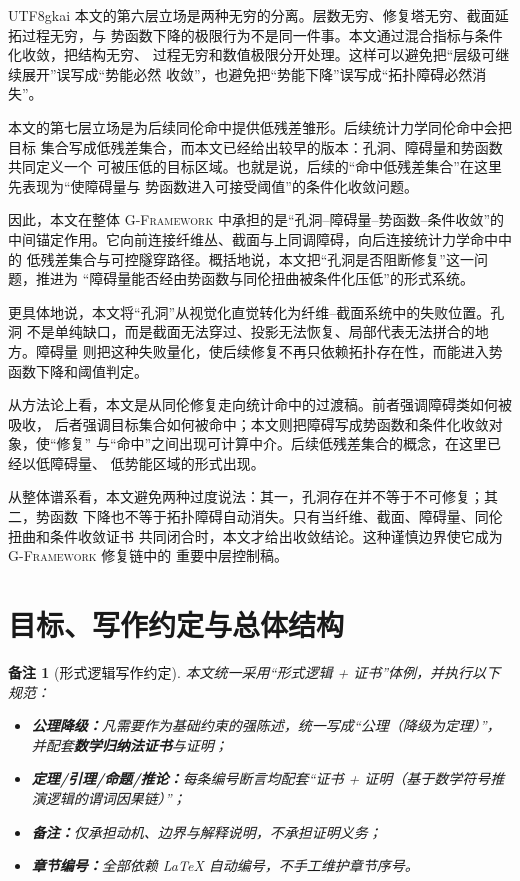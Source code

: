 \documentclass[12pt]{article}
\newtheorem{remark}{备注}[section]
\newcommand{\GFramework}{\textsc{G-Framework}}
\begin{document}
\begin{CJK*}{UTF8}{gkai}
本文的第六层立场是两种无穷的分离。层数无穷、修复塔无穷、截面延拓过程无穷，与
势函数下降的极限行为不是同一件事。本文通过混合指标与条件化收敛，把结构无穷、
过程无穷和数值极限分开处理。这样可以避免把“层级可继续展开”误写成“势能必然
收敛”，也避免把“势能下降”误写成“拓扑障碍必然消失”。

本文的第七层立场是为后续同伦命中提供低残差雏形。后续统计力学同伦命中会把目标
集合写成低残差集合，而本文已经给出较早的版本：孔洞、障碍量和势函数共同定义一个
可被压低的目标区域。也就是说，后续的“命中低残差集合”在这里先表现为“使障碍量与
势函数进入可接受阈值”的条件化收敛问题。

因此，本文在整体 \GFramework{} 中承担的是“孔洞--障碍量--势函数--条件收敛”的
中间锚定作用。它向前连接纤维丛、截面与上同调障碍，向后连接统计力学命中中的
低残差集合与可控隧穿路径。概括地说，本文把“孔洞是否阻断修复”这一问题，推进为
“障碍量能否经由势函数与同伦扭曲被条件化压低”的形式系统。

更具体地说，本文将“孔洞”从视觉化直觉转化为纤维--截面系统中的失败位置。孔洞
不是单纯缺口，而是截面无法穿过、投影无法恢复、局部代表无法拼合的地方。障碍量
则把这种失败量化，使后续修复不再只依赖拓扑存在性，而能进入势函数下降和阈值判定。

从方法论上看，本文是从同伦修复走向统计命中的过渡稿。前者强调障碍类如何被吸收，
后者强调目标集合如何被命中；本文则把障碍写成势函数和条件化收敛对象，使“修复”
与“命中”之间出现可计算中介。后续低残差集合的概念，在这里已经以低障碍量、
低势能区域的形式出现。

从整体谱系看，本文避免两种过度说法：其一，孔洞存在并不等于不可修复；其二，势函数
下降也不等于拓扑障碍自动消失。只有当纤维、截面、障碍量、同伦扭曲和条件收敛证书
共同闭合时，本文才给出收敛结论。这种谨慎边界使它成为 \GFramework{} 修复链中的
重要中层控制稿。

\setcounter{tocdepth}{2}
\setcounter{secnumdepth}{2}
\tableofcontents
\clearpage


\section{目标、写作约定与总体结构}

\begin{remark}[形式逻辑写作约定]
本文统一采用“形式逻辑 + 证书”体例，并执行以下规范：
\begin{itemize}
  \item \textbf{公理降级：}凡需要作为基础约束的强陈述，统一写成“公理（降级为定理）”，并配套\textbf{数学归纳法证书}与证明；
  \item \textbf{定理/引理/命题/推论：}每条编号断言均配套“证书 + 证明（基于数学符号推演逻辑的谓词因果链）”；
  \item \textbf{备注：}仅承担动机、边界与解释说明，不承担证明义务；
  \item \textbf{章节编号：}全部依赖 LaTeX 自动编号，不手工维护章节序号。
\end{itemize}
\end{remark}


\end{CJK*}
\end{document}
